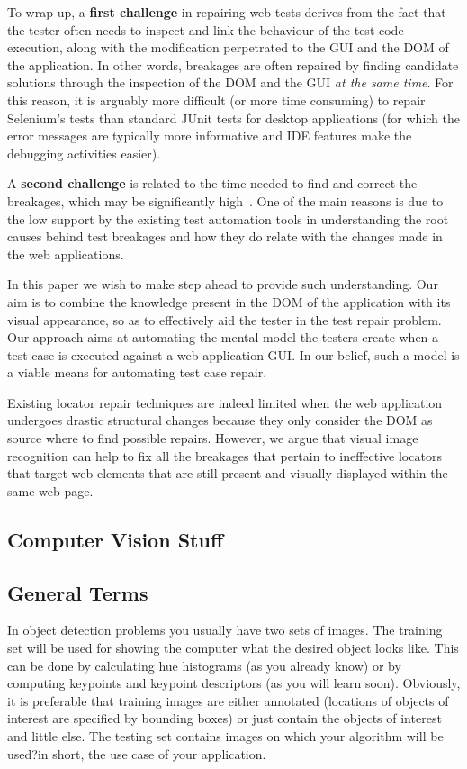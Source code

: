 To wrap up, a \textbf{first challenge} in repairing web tests derives from the fact that  
the tester often needs to inspect and link the behaviour of the test code execution, along with the modification perpetrated to the GUI and the DOM of the application. 
In other words, breakages are often repaired by finding candidate solutions through the inspection of the DOM and the GUI \textit{at the same time}.
For this reason, it is arguably more difficult (or more time consuming) to repair Selenium's tests than standard JUnit tests for desktop applications (for which the error messages are typically more informative and IDE features make the debugging activities easier).

A \textbf{second challenge} is related to the time needed to find and correct the breakages, which may be significantly high~\cite{Leotta-TAIC-2013,JAMAICA2013}. One of the main reasons is due to the low support by the existing test automation tools in understanding the root causes behind test breakages and how they do relate with the changes made in the web applications. 

In this paper we wish to make step ahead to provide such understanding. 
Our aim is to combine the knowledge present in the DOM of the application with its visual appearance, so as to effectively aid the tester in the test repair problem. Our approach aims at automating the mental model the testers create when a test case is executed against a web application GUI. In our belief, such a model is a viable means for automating test case repair.

Existing locator repair techniques are indeed limited when the web application undergoes drastic structural changes because they only consider the DOM as source where to find possible repairs.
However, we argue that visual image recognition can help to fix all the breakages that pertain to ineffective locators that target web elements that are still present and visually displayed within the same web page.

\subsection{Computer Vision Stuff}

\subsection{General Terms}
In object detection problems you usually have two sets of images. The training set will be used for showing the computer what the desired object looks like. This can be done by calculating hue histograms (as you already know) or by computing keypoints and keypoint descriptors (as you will learn soon). Obviously, it is preferable that training images are either annotated (locations of objects of interest are specified by bounding boxes) or just contain the objects of interest and little else. The testing set contains images on which your algorithm will be used?in short, the use case of your application.

